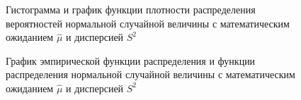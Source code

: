 \documentclass[12pt]{report}
\begin{document}
\begin{figure}[!h]
	\caption{Гистограмма и график функции плотности распределения вероятностей нормальной случайной величины с математическим ожиданием $\hat\mu$ и дисперсией $S^2$}
\end{figure}

\begin{figure}[!h]
	\caption{График эмпирической функции распределения и функции распределения нормальной случайной величины с математическим ожиданием $\hat\mu$ и дисперсией $S^2$}
\end{figure}
\end{document}
